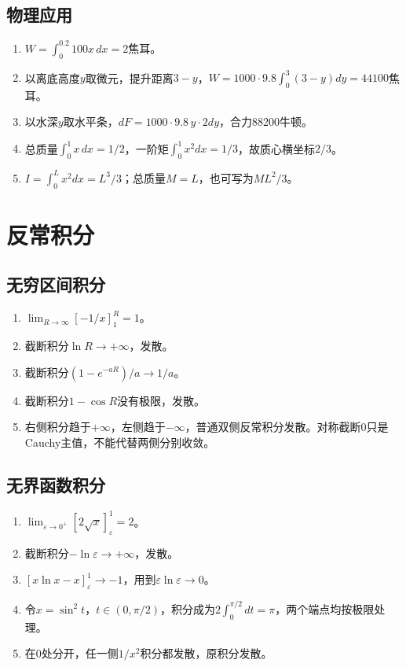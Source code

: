 \documentclass[11pt,a4paper,fontset=fandol]{ctexrep}
\begin{document}
\subsection{物理应用}
\begin{enumerate}
\item $W=\int_0^{0.2}100x\,dx=2$焦耳。
\item 以离底高度$y$取微元，提升距离$3-y$，$W=1000\cdot9.8\int_0^3(3-y)dy=44100$焦耳。
\item 以水深$y$取水平条，$dF=1000\cdot9.8\,y\cdot2dy$，合力88200牛顿。
\item 总质量$\int_0^1x\,dx=1/2$，一阶矩$\int_0^1x^2dx=1/3$，故质心横坐标$2/3$。
\item $I=\int_0^Lx^2dx=L^3/3$；总质量$M=L$，也可写为$ML^2/3$。
\end{enumerate}
\section{反常积分}
\subsection{无穷区间积分}
\begin{enumerate}
\item $\lim_{R\to\infty}[-1/x]_1^R=1$。
\item 截断积分$\ln R\to+\infty$，发散。
\item 截断积分$(1-e^{-aR})/a\to1/a$。
\item 截断积分$1-\cos R$没有极限，发散。
\item 右侧积分趋于$+\infty$，左侧趋于$-\infty$，普通双侧反常积分发散。对称截断0只是Cauchy主值，不能代替两侧分别收敛。
\end{enumerate}
\subsection{无界函数积分}
\begin{enumerate}
\item $\lim_{\varepsilon\to0^+}[2\sqrt x]_{\varepsilon}^1=2$。
\item 截断积分$-\ln\varepsilon\to+\infty$，发散。
\item $[x\ln x-x]_{\varepsilon}^1\to-1$，用到$\varepsilon\ln\varepsilon\to0$。
\item 令$x=\sin^2t$，$t\in(0,\pi/2)$，积分成为$2\int_0^{\pi/2}dt=\pi$，两个端点均按极限处理。
\item 在0处分开，任一侧$1/x^2$积分都发散，原积分发散。
\end{enumerate}
\end{document}
